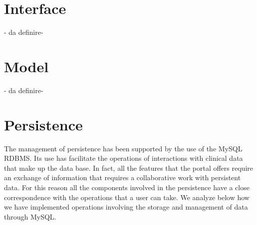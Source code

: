 \documentclass[a4paper]{report}
\begin{document}
\chapter{Interface}
- da definire-

\chapter{Model}
- da definire-

\chapter{Persistence}
The management of persistence has been supported by the use of the MySQL RDBMS. Its use has facilitate the operations of interactions with clinical data that make up the data base. In fact, all the features that the portal offers require an exchange of information that requires a collaborative work with persistent data. For this reason all the components involved in the persistence have a close correspondence with the operations that a user can take. We analyze below how we have implemented operations involving the storage and management of data through MySQL.
\end{document}
